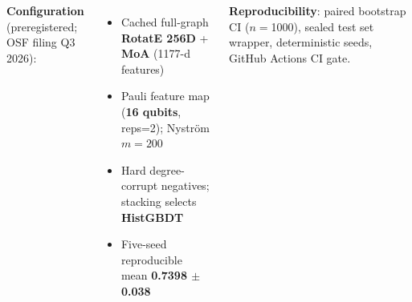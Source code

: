 \documentclass[25pt, a0paper, portrait, margin=0mm,
               innermargin=15mm, blockverticalspace=10mm,
               colspace=10mm, subcolspace=8mm]{tikzposter}
\begin{document}
\begin{columns}
{\vspace{6mm}
\textbf{Configuration} (preregistered; OSF filing Q3 2026):
\begin{itemize}
  \item Cached full-graph \textbf{RotatE 256D} + \textbf{MoA} (1177-d features)
  \item Pauli feature map (\textbf{16 qubits}, reps=2); Nystr\"{o}m $m{=}200$
  \item Hard degree-corrupt negatives; stacking selects \textbf{HistGBDT}
  \item Five-seed reproducible mean \textbf{0.7398 $\pm$ 0.038}
\end{itemize}

\vspace{4mm}
\textbf{Reproducibility}: paired bootstrap CI ($n=$1000),
sealed test set wrapper, deterministic seeds, GitHub Actions CI gate.
}

\end{columns}

\end{document}
